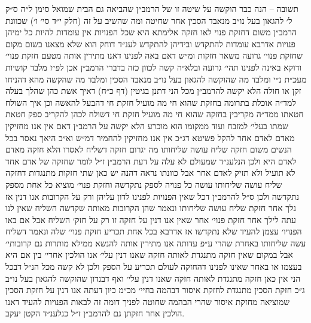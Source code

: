 \documentclass[12pt, openany]{book}
\begin{document}
\begin{multicols}{2}
תשובה – הנה כבר הוקשה על שיטה זו של הרמב״ן שהביאה גם הבית שמואל סימן ל״ה ס״ק ל׳ להגאון בעל נו״ב מנאבד הסכין אחר שחיטה ומה שהשיב על זה (חלק י״ד סי׳ ו׳) שכוונת הרמב״ן משום דחזקת פנוי לאו חזקה אלימתא היא שכל הפנויות אין עומדות להיות כל ימיהן פנויות אדרבא עומדות להתקדש ובידיהן להתקדש לענ״ד דוחק הוא שלא מצאנו בשום מקום שחזקת פנוי׳ גרועה משאר חזקות ומ״ש דאם באה לפנינו דאנו מתירין אותה מטעם חזקת פנוי׳ ודוקא באינה לפנינו תהי׳ גרועה ובלא״ה קשה לכוון כזה בדברי הרמב״ן אכן לפ״ז מלבד קושיות מעכ״ת נ״י ומלבד מה שהוקשה להגאון בעל נו״ב מנאבד הסכין ומלבד מה שהקשה מהא דהניחו זקן או חולה הלא יקשה להרמב״ן מכל הני דתנן בגיטין (דף כ״ח) דאיך אשת כהן שהלך בעלה למד״ה אוכלת בתרומה בחזקת שהוא חי מה מועיל חזקת חי דהבעל להאשה וכן איך השולח חטאתו ממד״ה מקריבין בחזקה שהוא חי מה מועיל חזקת חי דשולח לכהן להקריב ספק חטאת שמתו בעלי׳ למזבח ועוד ממקומו הוא מוכרע הלא יקשה על הרמב״ן דאם אין אנו מחזיקין מאדם לאדם אחר להקל פשיטא דג״כ אין אנו מחזיקין להחמיר דמ״ש וא״כ היאך נאסר בכל הנשים משום חזקה שליח עושה שליחותו מה יגרום חזקה דשליח לאסרו הלא חזקה מאדם לאדם היא ולכן הנלענ״ד שמעולם לא עלה על דעת הרמב״ן ז״ל לומר שחזקה של אדם אחד לא תועיל ולא תזיק לאדם אחר אבל כוונתו נראה דהנה יש כאן שתי חזקות מתנגדות דחזקה שליח עושה שליחותו עושה כל פנויה לספק נתקדשה וחזקת פנוי׳ מוציא כל אחת מספק נתקדשה ולכן ס״ל להרמב״ן דכל שאין הפנויות לפנינו לדון עליהן ורק על הקרובות אנו דנין אז נלך אחר חזקת שליח עושה שליחותו ונאמר שהן הקרובות מאותה שקדשה השליח שאין לנו עתה לילך אחר חזקת פנוי׳ אחר שאין אנו דנין על חזקה זו רק על חזק׳ השליח אבל אם באו הפנויו׳ עצמן להעיד שלא נתקדשו אז אדרבא בכל אחת תכריע חזקת פנוי׳ שלה ונאמר דשליח עשה שליחותו באחרת שהרי ע״פ עדותה אנו מתירין אותה להנשא ממילא מותרות גם קרובותי׳ אבל במקום שאין חזקה מתנגדת לאותה חזקה שאנו דנין עלי׳ אנו הולכין אחרי׳ בין אם היא בעצמו או באחר שאינו לפנינו דהחזקה לעולם תכריע על הספק ולכן לא קשה מכל הנ״ל דבכל הני אין כאן חזקה מתנגדת לאותה חזקה שאנו דנין עלי׳ ואף דבנדון שהוקשה להגאון בעל נו״ב ג״כ חזקת הסכין מתנגדת לחזקת איסור דבהמה בחיי׳ מכ״מ כיון דעתה אנו דנין על חזקת הסכין שמוציאה מחזקת איסור שהרי הבהמה שחוטה לפניך דומה זה לבאות הפנויות להעיד דאנו הולכין אחר חזקתן גם להרמב״ן ז״ל כנלענ״ד הקטן יעקב.\\\vspace{0pt}

\end{multicols}\newpage
\end{document}
